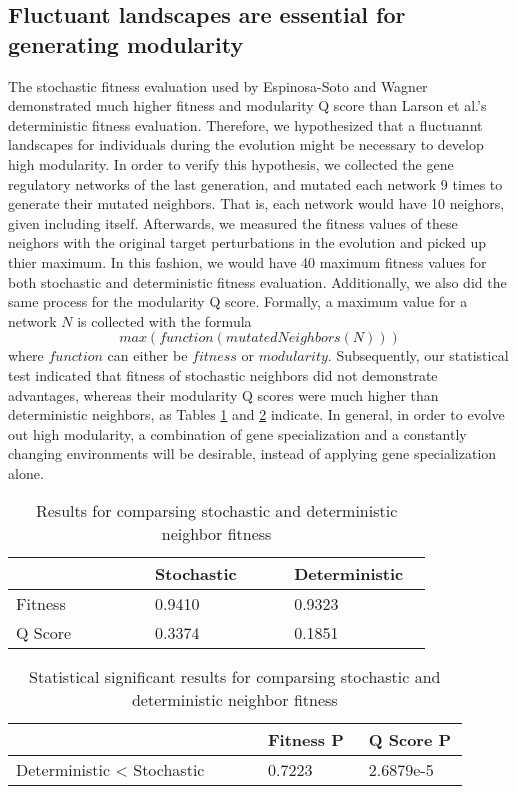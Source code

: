 \subsection{Fluctuant  landscapes are essential for generating modularity}
The stochastic fitness evaluation used by Espinosa-Soto and Wagner \cite{espinosa2010specialization} demonstrated much higher fitness and modularity Q score than Larson et al.'s deterministic fitness evaluation. Therefore, we hypothesized that a fluctuannt landscapes for individuals during the evolution might be necessary to develop high modularity. In order to verify this hypothesis, we collected the gene regulatory networks of the last generation, and mutated each network 9 times to generate their mutated neighbors. That is, each network would have 10 neighors, given including itself. Afterwards, we measured the fitness values of these neighors with the original target perturbations in the evolution and picked up thier maximum. In this fashion, we would have 40 maximum fitness values for both stochastic and deterministic fitness evaluation. Additionally, we also did the same process for the modularity Q score. Formally, a maximum value for a network $N$ is collected with the formula 
\begin{equation}
max(function(mutatedNeighbors(N)))
\end{equation}
where $function$ can either be $fitness$ or $modularity$. Subsequently, our statistical test indicated that fitness of stochastic neighbors did not demonstrate advantages, whereas their modularity Q scores were much higher than deterministic neighbors, as Tables \ref{table:4.12} and \ref{table:4.13} indicate. In general, in order to evolve out high modularity, a combination of gene specialization and a constantly changing environments will be desirable, instead of applying gene specialization alone. 
\begin{table}[h]
	\centering
	\caption{Results for comparsing stochastic and deterministic neighbor fitness}
	\label{table:4.12}
	\begin{tabular}{| p{0.3\linewidth}  | p{0.3\linewidth}  | p{0.3\linewidth} |} 
		\hline
		& Stochastic & Deterministic \\
		\hline
		Fitness & 0.9410 & 0.9323 \\ 
		\hline
		Q Score & 0.3374 & 0.1851 \\
		\hline
	\end{tabular}
\end{table}
\begin{table}[h]
	\centering
	\caption{Statistical significant results for comparsing stochastic and deterministic neighbor fitness}
	\label{table:4.13}
	\begin{tabular}{| p{0.5\linewidth}  | p{0.2\linewidth}  | p{0.2\linewidth}  |} 
		\hline
		& Fitness P & Q Score P \\
		\hline
		Deterministic < Stochastic & 0.7223 & 2.6879e-5 \\ 
		\hline
	\end{tabular}
\end{table}
